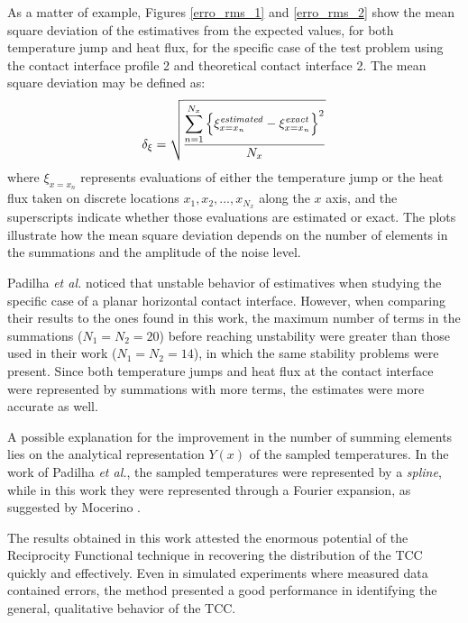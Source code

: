 \documentclass[conference,compsoc,fleqn]{IEEEtran}
\begin{document}
As a matter of example, Figures \ref{erro_rms_1} and \ref{erro_rms_2} show the mean square deviation of the estimatives from the expected values, for both temperature jump and heat flux, for the specific case of the test problem using the contact interface profile 2 and theoretical contact interface 2. The mean square deviation may be defined as:
\begin{equation}
\delta_{\xi} = \sqrt{\frac{\displaystyle\sum_{n=1}^{N_x}\left\lbrace \xi_{x=x_n}^\text{\textit{estimated}} - \xi_{x=x_n}^\text{\textit{exact}}\right \rbrace^2}{N_x}}
\end{equation}
where $\xi_{x=x_n}$ represents evaluations of either the temperature jump or the heat flux taken on discrete locations $x_1, x_2,..., x_{N_x}$ along the $x$ axis, and the superscripts indicate whether those evaluations are estimated or exact. The plots illustrate how the mean square deviation depends on the number of elements in the summations and the amplitude of the noise level.

Padilha \textit{et al.}\cite{artigo_padilha_3} noticed that unstable behavior of estimatives when studying the specific case of a planar horizontal contact interface. However, when comparing their results to the ones found in this work, the maximum number of terms in the summations ($N_1=N_2=20$) before reaching unstability were greater than those used in their work ($N_1=N_2=14$), in which the same stability problems were present. Since both temperature jumps and heat flux at the contact interface were represented by summations with more terms, the estimates were more accurate as well.

A possible explanation for the improvement in the number of summing elements lies on the analytical representation $Y(x)$ of the sampled temperatures. In the work of Padilha \textit{et al.}\cite{artigo_padilha_3}, the sampled temperatures were represented by a \textit{spline}, while in this work they were represented through a Fourier expansion, as suggested by Mocerino \cite{artigo_mocerino}.


The results obtained in this work attested the enormous potential of the Reciprocity Functional technique in recovering the distribution of the TCC quickly and effectively. Even in simulated experiments where measured data contained errors, the method presented a good performance in identifying the general, qualitative behavior of the TCC.
\end{document}
